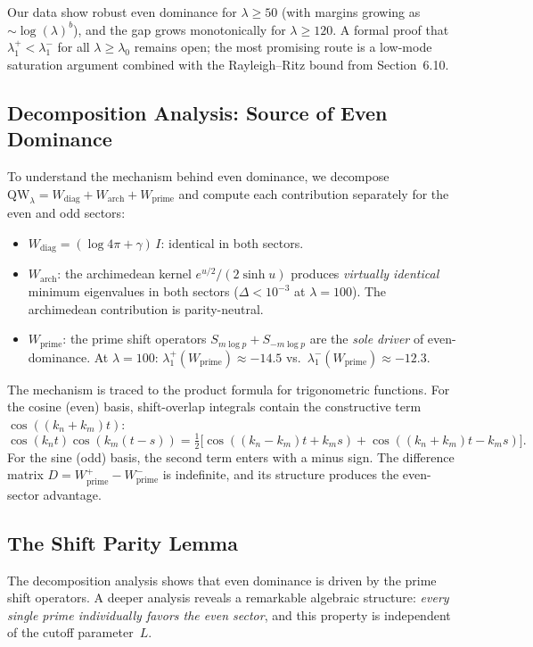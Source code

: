 \documentclass[12pt,a4paper]{article}
\theoremstyle{definition}
\theoremstyle{remark}
\begin{document}
Our data show robust even dominance for $\lambda \geq 50$ (with margins growing as $\sim \log(\lambda)^b$), and the gap grows monotonically for $\lambda \geq 120$. A formal proof that $\lambda_1^+ < \lambda_1^-$ for all $\lambda \geq \lambda_0$ remains open; the most promising route is a low-mode saturation argument combined with the Rayleigh--Ritz bound from Section~6.10.

\subsection{Decomposition Analysis: Source of Even Dominance}

To understand the mechanism behind even dominance, we decompose $\mathrm{QW}_\lambda = W_{\mathrm{diag}} + W_{\mathrm{arch}} + W_{\mathrm{prime}}$ and compute each contribution separately for the even and odd sectors:

\begin{itemize}
  \item $W_{\mathrm{diag}} = (\log 4\pi + \gamma)\,I$: identical in both sectors.
  \item $W_{\mathrm{arch}}$: the archimedean kernel $e^{u/2}/(2\sinh u)$ produces \emph{virtually identical} minimum eigenvalues in both sectors ($\Delta < 10^{-3}$ at $\lambda = 100$). The archimedean contribution is parity-neutral.
  \item $W_{\mathrm{prime}}$: the prime shift operators $S_{m\log p} + S_{-m\log p}$ are the \emph{sole driver} of even-dominance. At $\lambda = 100$: $\lambda_1^+(W_{\mathrm{prime}}) \approx -14.5$ vs.\ $\lambda_1^-(W_{\mathrm{prime}}) \approx -12.3$.
\end{itemize}

The mechanism is traced to the product formula for trigonometric functions. For the cosine (even) basis, shift-overlap integrals contain the constructive term $\cos((k_n + k_m)t)$:
\[
  \cos(k_n t)\cos(k_m(t-s)) = \tfrac{1}{2}\bigl[\cos((k_n-k_m)t + k_m s) + \cos((k_n+k_m)t - k_m s)\bigr].
\]
For the sine (odd) basis, the second term enters with a minus sign. The difference matrix $D = W_{\mathrm{prime}}^+ - W_{\mathrm{prime}}^-$ is indefinite, and its structure produces the even-sector advantage.

\subsection{The Shift Parity Lemma}
\label{sec:shift-parity}

The decomposition analysis shows that even dominance is driven by the prime shift operators. A deeper analysis reveals a remarkable algebraic structure: \emph{every single prime individually favors the even sector}, and this property is independent of the cutoff parameter~$L$.
\end{document}

